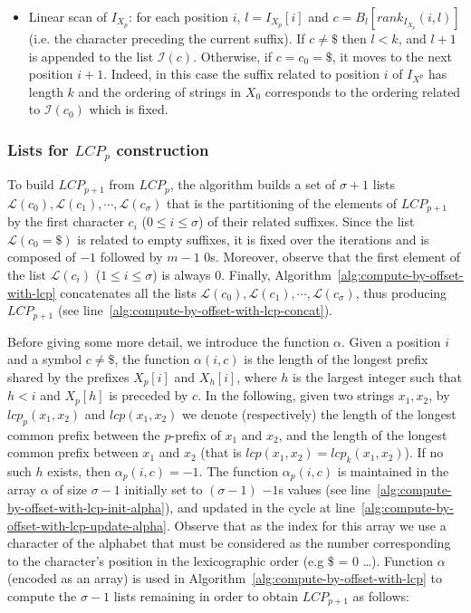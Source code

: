 \documentclass[a4paper,12pt, oneside]{article}
\begin{document}
\begin{itemize}
	\item Linear scan of $I_{X_p}$: for each position $i$,  $l = I_{X_p}[i]$ and $c = B_l[rank_{I_{X_p}}(i, l)]$ (i.e. the character preceding the current suffix). If $c \neq \$$ then $l < k$, and $l+1$ is appended to the list $\mathcal{I}(c)$. Otherwise, if $c = c_0 = \$$, it moves to the next position $i+1$. Indeed, in this case the suffix related to position $i$ of $I_{X^p}$ has length $k$ and the  ordering of strings in $X_0$ corresponds to the ordering related to $\mathcal{I}(c_0)$ which is fixed.
\end{itemize}


\subsubsection{Lists for $LCP_p$ construction}

To build $LCP_{p+1}$ from $LCP_p$, the algorithm builds  a set of $\sigma+1$ lists $\mathcal{L}(c_0), \mathcal{L}(c_1), \cdots, \mathcal{L}(c_{\sigma})$ that is the partitioning of the elements of $LCP_{p+1}$ by the first character $c_i$ ($0 \leq i \leq \sigma$) of their related suffixes.
Since the list $\mathcal{L}(c_0=\$)$ is related to empty suffixes, it is fixed over the iterations and is composed of $-1$ followed by $m-1$ $0$s. Moreover, observe that the first element of the list $\mathcal{L}(c_i)$ ($1 \leq i \leq \sigma$) is always $0$.
Finally, Algorithm~\ref{alg:compute-by-offset-with-lcp} concatenates all the lists $\mathcal{L}(c_0), \mathcal{L}(c_1), \cdots, \mathcal{L}(c_{\sigma})$, thus producing $LCP_{p+1}$ (see line~\ref{alg:compute-by-offset-with-lcp-concat}).

Before giving some more detail, we introduce the function $\alpha$. Given a position $i$ and a symbol $c \neq \$$, the function $\alpha(i, c)$ is the length of the longest prefix shared by the prefixes ${X_p}[i]$ and $X_h[i]$, where $h$ is the largest integer such that $h < i$ and $X_p[h]$ is preceded by $c$. In the following, given two strings $x_1, x_2$, by $lcp_p(x_1, x_2)$ and $lcp(x_1, x_2)$ we denote (respectively) the length of the longest common prefix between the $p$-prefix of $x_1$ and $x_2$, and the length of the longest common prefix between $x_1$ and $x_2$ (that is $lcp(x_1, x_2)=lcp_k(x_1,x_2)$).
If no such $h$ exists, then $\alpha_p(i,c) = -1$. The function $\alpha_p(i,c)$ is maintained in the array $\alpha$ of size $\sigma-1$ initially set to $(\sigma-1)$  $-1$s values (see line~\ref{alg:compute-by-offset-with-lcp-init-alpha}), and updated in the cycle at line~\ref{alg:compute-by-offset-with-lcp-update-alpha}. Observe that as the index for this array we use a character of the alphabet that must be considered as the number corresponding to the character's position in the lexicographic order (e.g \$ = 0 \ldots).
Function $\alpha$ (encoded as an array) is used in Algorithm~\ref{alg:compute-by-offset-with-lcp} to compute the $\sigma - 1$ lists remaining in order to obtain $LCP_{p+1}$ as follows:
\end{document}
